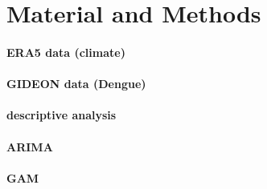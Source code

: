 \section{Material and Methods}
	\paragraph{ERA5 data (climate)}
	\paragraph{GIDEON data (Dengue)}
	\paragraph{descriptive analysis}
	\paragraph{ARIMA}
	\paragraph{GAM}
	
